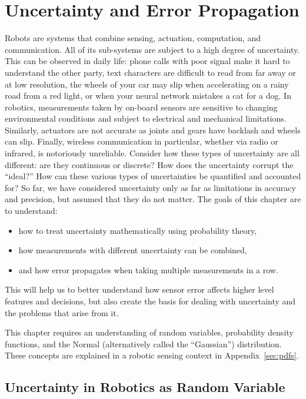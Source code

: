 \chapter{Uncertainty and Error Propagation}\label{chap:uncertainty}

Robots are systems that combine sensing, actuation, computation, and communication. All of its sub-systems are subject to a high degree
of uncertainty. This can be observed in daily life: phone calls with poor signal make it hard to understand the other party,
text characters are difficult to read from far away or at low resolution, the wheels of your car may slip when accelerating on a rainy road from a red light, or when your neural network mistakes a cat for a dog. In robotics, measurements
taken by on-board sensors are sensitive to changing environmental conditions and subject to electrical and mechanical limitations.
Similarly, actuators are not accurate as joints and gears have backlash and wheels can slip. Finally, wireless communication in particular,
whether via radio or infrared, is notoriously unreliable. Consider how these types of
uncertainty are all different: are they continuous or discrete? How does the uncertainty corrupt the ``ideal?'' How can these various
types of uncertainties be quantified and accounted for? So far, we have considered uncertainty only as far as limitations in accuracy and precision, but assumed that they do not matter. The goals of this chapter are to understand:
\begin{itemize}
    \item how to treat uncertainty mathematically using probability theory,
    \item how measurements with different uncertainty can be combined,
    \item and how error propagates when taking multiple measurements in a row.
\end{itemize}

This will help us to better understand how sensor error affects higher level features and decisions, but also create the basis for dealing with uncertainty and the problems that arise from it. 

This chapter requires an understanding of random variables, probability density functions, and the Normal
(alternatively called the ``Gaussian'') distribution. These concepts are explained in a robotic sensing context in Appendix~\ref{sec:pdfs}.

\section{Uncertainty in Robotics as Random Variable}

